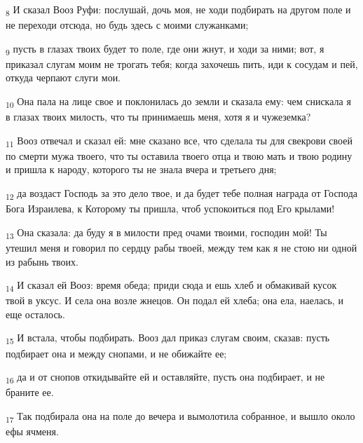 \begin{tcolorbox}
\textsubscript{8} И сказал Вооз Руфи: послушай, дочь моя, не ходи подбирать на другом поле и не переходи отсюда, но будь здесь с моими служанками;
\end{tcolorbox}
\begin{tcolorbox}
\textsubscript{9} пусть в глазах твоих будет то поле, где они жнут, и ходи за ними; вот, я приказал слугам моим не трогать тебя; когда захочешь пить, иди к сосудам и пей, откуда черпают слуги мои.
\end{tcolorbox}
\begin{tcolorbox}
\textsubscript{10} Она пала на лице свое и поклонилась до земли и сказала ему: чем снискала я в глазах твоих милость, что ты принимаешь меня, хотя я и чужеземка?
\end{tcolorbox}
\begin{tcolorbox}
\textsubscript{11} Вооз отвечал и сказал ей: мне сказано все, что сделала ты для свекрови своей по смерти мужа твоего, что ты оставила твоего отца и твою мать и твою родину и пришла к народу, которого ты не знала вчера и третьего дня;
\end{tcolorbox}
\begin{tcolorbox}
\textsubscript{12} да воздаст Господь за это дело твое, и да будет тебе полная награда от Господа Бога Израилева, к Которому ты пришла, чтоб успокоиться под Его крылами!
\end{tcolorbox}
\begin{tcolorbox}
\textsubscript{13} Она сказала: да буду я в милости пред очами твоими, господин мой! Ты утешил меня и говорил по сердцу рабы твоей, между тем как я не стою ни одной из рабынь твоих.
\end{tcolorbox}
\begin{tcolorbox}
\textsubscript{14} И сказал ей Вооз: время обеда; приди сюда и ешь хлеб и обмакивай кусок твой в уксус. И села она возле жнецов. Он подал ей хлеба; она ела, наелась, и еще осталось.
\end{tcolorbox}
\begin{tcolorbox}
\textsubscript{15} И встала, чтобы подбирать. Вооз дал приказ слугам своим, сказав: пусть подбирает она и между снопами, и не обижайте ее;
\end{tcolorbox}
\begin{tcolorbox}
\textsubscript{16} да и от снопов откидывайте ей и оставляйте, пусть она подбирает, и не браните ее.
\end{tcolorbox}
\begin{tcolorbox}
\textsubscript{17} Так подбирала она на поле до вечера и вымолотила собранное, и вышло около ефы ячменя.
\end{tcolorbox}
